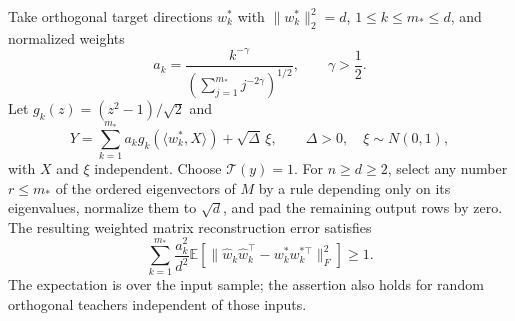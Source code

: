 \begin{proposition}
\label{prop:source-constant-preprocessing}
Take orthogonal target directions $w_k^*$ with $\|w_k^*\|_2^2=d$,
$1\leq k\leq m_*\leq d$, and normalized weights
\[
 a_k=\frac{k^{-\gamma}}{\left(\sum_{j=1}^{m_*}j^{-2\gamma}\right)^{1/2}},
 \qquad \gamma>\frac12.
\]
Let $g_k(z)=(z^2-1)/\sqrt2$ and
\[
 Y=\sum_{k=1}^{m_*}a_kg_k(\langle w_k^*,X\rangle)
          +\sqrt\Delta\,\xi,
 \qquad \Delta>0,\quad \xi\sim N(0,1),
\]
with $X$ and $\xi$ independent. Choose $\mathcal T(y)=1$.
For $n\geq d\geq2$, select any number $r\leq m_*$ of the ordered
eigenvectors of $M$ by a rule depending only on its eigenvalues,
normalize them to $\sqrt d$, and pad the remaining output rows by zero.
The resulting weighted matrix reconstruction error satisfies
\begin{equation}
 \sum_{k=1}^{m_*}\frac{a_k^2}{d^2}
 \mathbb E\left[
 \|\widehat w_k\widehat w_k^\top-w_k^*w_k^{*\top}\|_F^2
 \right]\geq1.
 \label{eq:source-lower-error}
\end{equation}
The expectation is over the input sample; the assertion also holds for
random orthogonal teachers independent of those inputs.
\end{proposition}
